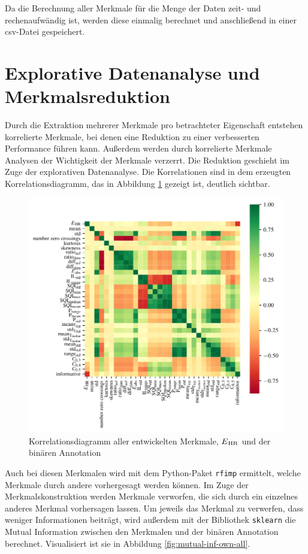 Da die Berechnung aller Merkmale für die Menge der Daten zeit- und rechenaufwändig ist, werden diese einmalig berechnet und anschließend in einer csv-Datei gespeichert.

\section{Explorative Datenanalyse und Merkmalsreduktion}\label{reduction}

Durch die Extraktion mehrerer Merkmale pro betrachteter Eigenschaft entstehen korrelierte Merkmale, bei denen eine Reduktion zu einer verbesserten Performance führen kann. Außerdem werden durch korrelierte Merkmale Analysen der Wichtigkeit der Merkmale verzerrt. Die Reduktion geschieht im Zuge der explorativen Datenanalyse. Die Korrelationen sind in dem erzeugten Korrelationsdiagramm, das in Abbildung \ref{fig:corr-heatmap-own} gezeigt ist, deutlich sichtbar.

\begin{figure}[H]
	\centering
	\includegraphics{pic/corr-heatmap-own.pdf}
	\caption{Korrelationsdiagramm aller entwickelten Merkmale, $E\textsubscript{HR}$ und der binären Annotation}
	\label{fig:corr-heatmap-own}
\end{figure}
 
Auch bei diesen Merkmalen wird mit dem Python-Paket \texttt{rfimp} ermittelt, welche Merkmale durch andere vorhergesagt werden können. Im Zuge der Merkmalskonstruktion werden Merkmale verworfen, die sich durch ein einzelnes anderes Merkmal vorhersagen lassen. Um jeweils das Merkmal zu verwerfen, dass weniger Informationen beiträgt, wird außerdem mit der Bibliothek \texttt{sklearn} die Mutual Information zwischen den Merkmalen und der binären Annotation berechnet. Visualisiert ist sie in Abbildung \ref{fig:mutual-inf-own-all}.

